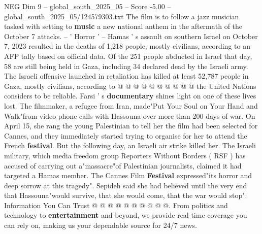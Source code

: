 \begin{textsample}{NEG Dim 9 – global\_south\_2025\_05 – Score -5.00 – global\_south\_2025\_05/124579303.txt}
The film is to follow a jazz musician tasked with setting to \textbf{music} a new national anthem in the aftermath of the October 7 attacks. -- ' Horror ' -- Hamas ' s assault on southern Israel on October 7, 2023 resulted in the deaths of 1,218 people, mostly civilians, according to an AFP tally based on official data.
Of the 251 people abducted in Israel that day, 58 are still being held in Gaza, including 34 declared dead by the Israeli army.
The Israeli offensive launched in retaliation has killed at least 52,787 people in Gaza, mostly civilians, according to @ @ @ @ @ @ @ @ @ @ the United Nations considers to be reliable.
Farsi ' s \textbf{documentary} shines light on one of these lives lost.
The filmmaker, a refugee from Iran, made"Put Your Soul on Your Hand and Walk"from video phone calls with Hassouna over more than 200 days of war.
On April 15, she rang the young Palestinian to tell her the film had been selected for Cannes, and they immediately started trying to organise for her to attend the French \textbf{festival}.
But the following day, an Israeli air strike killed her.
The Israeli military, which media freedom group Reporters Without Borders ( RSF ) has accused of carrying out a"massacre"of Palestinian journalists, claimed it had targeted a Hamas member.
The Cannes Film \textbf{Festival} expressed"its horror and deep sorrow at this tragedy".
Sepideh said she had believed until the very end that Hassouna"would survive, that she would come, that the war would stop".
Information You Can Trust @ @ @ @ @ @ @ @ @ @.
From politics and technology to \textbf{entertainment} and beyond, we provide real-time coverage you can rely on, making us your dependable source for 24/7 news.

\end{textsample}
